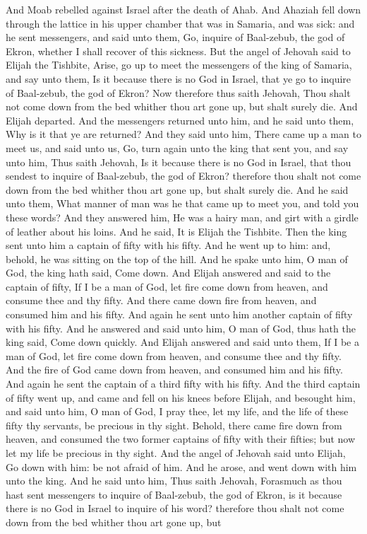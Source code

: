 


And Moab rebelled against Israel after the death of Ahab. And Ahaziah fell down through the lattice in his upper chamber that was in Samaria, and was sick: and he sent messengers, and said unto them, Go, inquire of Baal-zebub, the god of Ekron, whether I shall recover of this sickness. But the angel of Jehovah said to Elijah the Tishbite, Arise, go up to meet the messengers of the king of Samaria, and say unto them, Is it because there is no God in Israel, that ye go to inquire of Baal-zebub, the god of Ekron? Now therefore thus saith Jehovah, Thou shalt not come down from the bed whither thou art gone up, but shalt surely die. And Elijah departed.  And the messengers returned unto him, and he said unto them, Why is it that ye are returned? And they said unto him, There came up a man to meet us, and said unto us, Go, turn again unto the king that sent you, and say unto him, Thus saith Jehovah, Is it because there is no God in Israel, that thou sendest to inquire of Baal-zebub, the god of Ekron? therefore thou shalt not come down from the bed whither thou art gone up, but shalt surely die. And he said unto them, What manner of man was he that came up to meet you, and told you these words? And they answered him, He was a hairy man, and girt with a girdle of leather about his loins. And he said, It is Elijah the Tishbite.  Then the king sent unto him a captain of fifty with his fifty. And he went up to him: and, behold, he was sitting on the top of the hill. And he spake unto him, O man of God, the king hath said, Come down. And Elijah answered and said to the captain of fifty, If I be a man of God, let fire come down from heaven, and consume thee and thy fifty. And there came down fire from heaven, and consumed him and his fifty. And again he sent unto him another captain of fifty with his fifty. And he answered and said unto him, O man of God, thus hath the king said, Come down quickly. And Elijah answered and said unto them, If I be a man of God, let fire come down from heaven, and consume thee and thy fifty. And the fire of God came down from heaven, and consumed him and his fifty. And again he sent the captain of a third fifty with his fifty. And the third captain of fifty went up, and came and fell on his knees before Elijah, and besought him, and said unto him, O man of God, I pray thee, let my life, and the life of these fifty thy servants, be precious in thy sight. Behold, there came fire down from heaven, and consumed the two former captains of fifty with their fifties; but now let my life be precious in thy sight. And the angel of Jehovah said unto Elijah, Go down with him: be not afraid of him. And he arose, and went down with him unto the king. And he said unto him, Thus saith Jehovah, Forasmuch as thou hast sent messengers to inquire of Baal-zebub, the god of Ekron, is it because there is no God in Israel to inquire of his word? therefore thou shalt not come down from the bed whither thou art gone up, but 